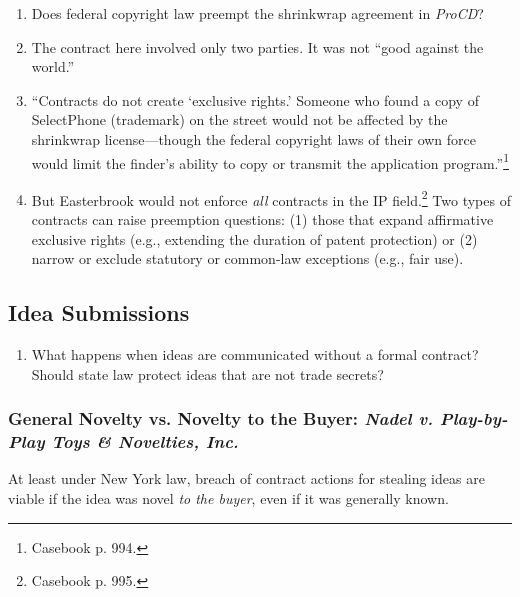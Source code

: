 \begin{enumerate}
    \item Does federal copyright law preempt the shrinkwrap agreement in 
    \emph{ProCD}?
    \item The contract here involved only two parties. It was not ``good 
    against the world.''
    \item ``Contracts do not create `exclusive rights.' Someone who found a 
    copy of SelectPhone (trademark) on the street would not be affected by the 
    shrinkwrap license---though the federal copyright laws of their own force 
    would limit the finder's ability to copy or transmit the application 
    program.''\footnote{Casebook p. 994.}
    \item But Easterbrook would not enforce \emph{all} contracts in the IP 
    field.\footnote{Casebook p. 995.} Two types of contracts can raise 
    preemption questions: (1) those that expand affirmative exclusive rights 
    (e.g., extending the duration of patent protection) or (2) narrow or 
    exclude statutory or common-law exceptions (e.g., fair use).
\end{enumerate}

\subsection{Idea Submissions}

\begin{enumerate}
    \item What happens when ideas are communicated without a formal contract?  
    Should state law protect ideas that are not trade secrets?
\end{enumerate}

\subsubsection{General Novelty vs. Novelty to the Buyer: \emph{Nadel v.  
Play-by-Play Toys \& Novelties, Inc.}}

At least under New York law, breach of contract actions for stealing ideas are 
viable if the idea was novel \emph{to the buyer}, even if it was generally 
known.

